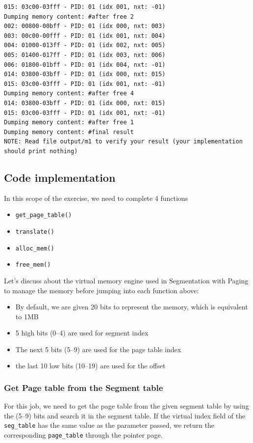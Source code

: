 \documentclass[a4paper]{article}
\numberwithin{equation}{section}
\begin{document}
\begin{mdframed}[leftline=false,rightline=false,backgroundcolor=teal!10,nobreak=false]
\begin{verbatim}
015: 03c00-03fff - PID: 01 (idx 001, nxt: -01)
Dumping memory content: #after free 2
002: 00800-00bff - PID: 01 (idx 000, nxt: 003)
003: 00c00-00fff - PID: 01 (idx 001, nxt: 004)
004: 01000-013ff - PID: 01 (idx 002, nxt: 005)
005: 01400-017ff - PID: 01 (idx 003, nxt: 006)
006: 01800-01bff - PID: 01 (idx 004, nxt: -01)
014: 03800-03bff - PID: 01 (idx 000, nxt: 015)
015: 03c00-03fff - PID: 01 (idx 001, nxt: -01)
Dumping memory content: #after free 4
014: 03800-03bff - PID: 01 (idx 000, nxt: 015)
015: 03c00-03fff - PID: 01 (idx 001, nxt: -01)
Dumping memory content: #after free 1
Dumping memory content: #final result
NOTE: Read file output/m1 to verify your result (your implementation should print nothing)
  \end{verbatim}
\end{mdframed}

\newpage
\subsection{Code implementation}
In this scope of the exercise, we need to complete 4 functions
\begin{itemize}
  \item \texttt{get_page_table()}
  \item \texttt{translate()}
  \item \texttt{alloc_mem()}
  \item \texttt{free_mem()}
\end{itemize}

Let's discuss about the virtual memory engine used in Segmentation with Paging to manage the memory before jumping into each function above:
\begin{itemize}
  \item By default, we are given 20 bits to represent the memory, which is equivalent to 1MB
  \item 5 high bits (0--4)  are used for segment index
  \item The next 5 bits (5--9) are used for the page table index
  \item the last 10 low bits (10--19) are used for the offset
\end{itemize}

\subsubsection{Get Page table from the Segment table}
For this job, we need to get the page table from the given segment table by using the (5--9) bits and search it in the segment table.
If the virtual index field of the \texttt{seg_table} has the same value as the parameter passed, we return the corresponding \texttt{page_table} through the pointer page.
\end{document}
